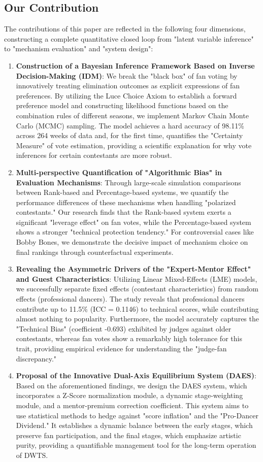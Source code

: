 \documentclass[12pt]{article}
\begin{document}
	\subsection{Our Contribution}
	The contributions of this paper are reflected in the following four dimensions, constructing a complete quantitative closed loop from "latent variable inference" to "mechanism evaluation" and "system design":
	\begin{enumerate}
		\item \textbf{Construction of a Bayesian Inference Framework Based on Inverse Decision-Making (IDM)}: We break the "black box" of fan voting by innovatively treating elimination outcomes as explicit expressions of fan preferences. By utilizing the Luce Choice Axiom to establish a forward preference model and constructing likelihood functions based on the combination rules of different seasons, we implement Markov Chain Monte Carlo (MCMC) sampling. The model achieves a hard accuracy of 98.11\% across 264 weeks of data and, for the first time, quantifies the "Certainty Measure" of vote estimation, providing a scientific explanation for why vote inferences for certain contestants are more robust.
		\item \textbf{Multi-perspective Quantification of "Algorithmic Bias" in Evaluation Mechanisms}: Through large-scale simulation comparisons between Rank-based and Percentage-based systems, we quantify the performance differences of these mechanisms when handling "polarized contestants." Our research finds that the Rank-based system exerts a significant "leverage effect" on fan votes, while the Percentage-based system shows a stronger "technical protection tendency." For controversial cases like Bobby Bones, we demonstrate the decisive impact of mechanism choice on final rankings through counterfactual experiments.
		\item \textbf{Revealing the Asymmetric Drivers of the "Expert-Mentor Effect" and Guest Characteristics}: Utilizing Linear Mixed-Effects (LME) models, we successfully separate fixed effects (contestant characteristics) from random effects (professional dancers). The study reveals that professional dancers contribute up to 11.5\% (ICC = 0.1146) to technical scores, while contributing almost nothing to popularity. Furthermore, the model accurately captures the "Technical Bias" (coefficient -0.693) exhibited by judges against older contestants, whereas fan votes show a remarkably high tolerance for this trait, providing empirical evidence for understanding the "judge-fan discrepancy."
		\item \textbf{Proposal of the Innovative Dual-Axis Equilibrium System (DAES)}: Based on the aforementioned findings, we design the DAES system, which incorporates a Z-Score normalization module, a dynamic stage-weighting module, and a mentor-premium correction coefficient. This system aims to use statistical methods to hedge against "score inflation" and the "Pro-Dancer Dividend." It establishes a dynamic balance between the early stages, which preserve fan participation, and the final stages, which emphasize artistic purity, providing a quantifiable management tool for the long-term operation of DWTS.
		

\end{enumerate}
\end{document}
